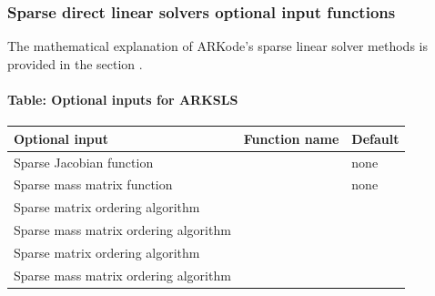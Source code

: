 \documentclass[letterpaper,10pt,english]{sphinxmanual}
\begin{document}
\subsubsection{Sparse direct linear solvers optional input functions}
\label{c_interface/User_callable:sparse-direct-linear-solvers-optional-input-functions}\label{c_interface/User_callable:cinterface-arkslsinputs}
The mathematical explanation of ARKode's sparse linear solver methods
is provided in the section {\hyperref[Mathematics:mathematics-linear]{\emph{}}}.


\paragraph{Table: Optional inputs for ARKSLS}
\label{c_interface/User_callable:table-optional-inputs-for-arksls}
\begin{tabulary}{\linewidth}{|L|L|L|}
\hline
\textsf{\relax 
Optional input
} & \textsf{\relax 
Function name
} & \textsf{\relax 
Default
}\\
\hline
Sparse Jacobian function
 & 
{\hyperref[c_interface/User_callable:c.ARKSlsSetSparseJacFn]{\emph{}}}
 & 
none
\\
\hline
Sparse mass matrix function
 & 
{\hyperref[c_interface/User_callable:c.ARKSlsSetSparseMassFn]{\emph{}}}
 & 
none
\\
\hline
Sparse matrix ordering algorithm
 & 
{\hyperref[c_interface/User_callable:c.ARKKLUSetOrdering]{\emph{}}}
 & 
\\
\hline
Sparse mass matrix ordering algorithm
 & 
{\hyperref[c_interface/User_callable:c.ARKMassKLUSetOrdering]{\emph{}}}
 & 
\\
\hline
Sparse matrix ordering algorithm
 & 
{\hyperref[c_interface/User_callable:c.ARKSuperLUMTSetOrdering]{\emph{}}}
 & 
\\
\hline
Sparse mass matrix ordering algorithm
 & 
{\hyperref[c_interface/User_callable:c.ARKMassSuperLUMTSetOrdering]{\emph{}}}
 & 
\\
\hline\end{tabulary}
\end{document}
